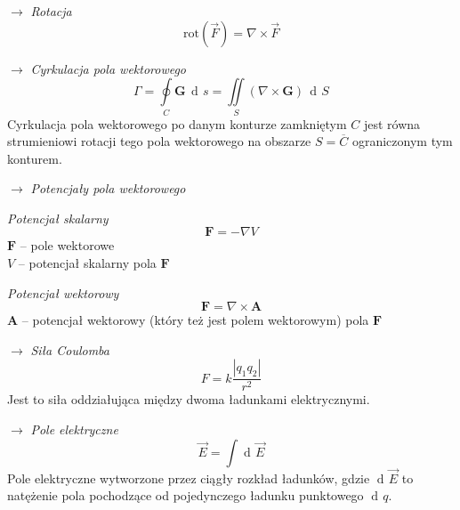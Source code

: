 \documentclass[12pt]{article}
\newenvironment{wzor}[1]{\par{\Large $\longrightarrow$ \textit{#1}}}
    {\newline {\color{grey} \rule{\linewidth}{0.3pt}}}
\DeclareMathOperator{\der}{\operatorname{d}\!}
\begin{document}
\begin{wzor}{Rotacja}
    \begin{equation}
        \mathrm{rot}(\Vec{F}) = \nabla \times \Vec{F}
    \end{equation}
\end{wzor}

\newpage

\begin{wzor}{Cyrkulacja pola wektorowego}
    \begin{equation}
        \Gamma = \oint\limits_C \mathbf{G} \, \der s
            = \iint\limits_S (\nabla \times \mathbf{G}) \, \der S
    \end{equation}
    Cyrkulacja pola wektorowego po danym konturze zamkniętym $C$ jest równa strumieniowi
    rotacji tego pola wektorowego na obszarze $S = \overline{C}$ ograniczonym tym konturem.
\end{wzor}

\begin{wzor}{Potencjały pola wektorowego}
    \par \textit{Potencjał skalarny}
    \begin{equation}
        \mathbf{F} = - \nabla V
    \end{equation}
    $\mathbf{F}$ -- pole wektorowe\\
    $V$ -- potencjał skalarny pola $\mathbf{F}$
    \par \textit{Potencjał wektorowy}
    \begin{equation}
        \mathbf{F} = \nabla \times \mathbf{A}
    \end{equation}
    $\mathbf{A}$ -- potencjał wektorowy (który też jest polem wektorowym) pola $\mathbf{F}$
\end{wzor}

\begin{wzor}{Siła Coulomba}
    \begin{equation}
        F = k \frac{|q_1 q_2|}{r^2}
    \end{equation}
    Jest to siła oddziałująca między dwoma ładunkami elektrycznymi.
\end{wzor}

\begin{wzor}{Pole elektryczne}
    \begin{equation}
        \Vec{E} = \int \der \Vec{E}
    \end{equation}
    Pole elektryczne wytworzone przez ciągły rozkład ładunków, gdzie $\der\Vec{E}$ to
    natężenie pola pochodzące od pojedynczego ładunku punktowego $\der q$.
\end{wzor}
\end{document}
